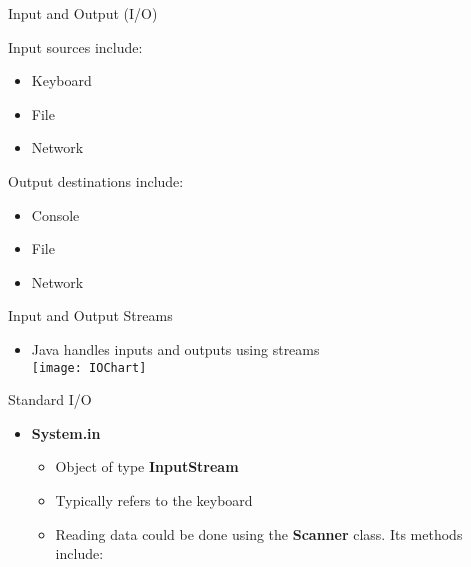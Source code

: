\documentclass[11pt]{article}
\begin{document}
\begin{itemize}
	\item Input and Output (I/O)
			\end{minipage}
			\begin{minipage}[t]{0.5\textwidth}
			\item Output destinations include:
				\begin{itemize}
					\item Console
					\item File
					\item Network
				\end{itemize}
			\end{minipage}
		\end{itemize}

	\item Input and Output Streams
		\begin{itemize}
			\item Java handles inputs and outputs using streams\\
			\texttt{[image: IOChart]}
		\end{itemize}

	\item Standard I/O
		\begin{itemize}
			\item \textbf{System.in}
				\begin{itemize}
					\item Object of type \textbf{InputStream}
					\item Typically refers to the keyboard
					\item Reading data could be done using the \textbf{Scanner} class. Its methods include:
				\end{itemize}


\end{itemize}
\end{itemize}
\end{document}

